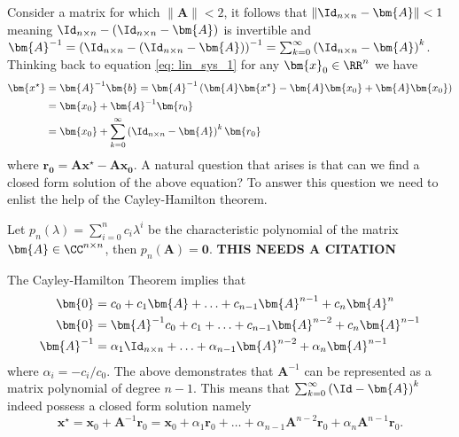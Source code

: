 Consider a matrix for which $\| \bm{A} \| < 2$, it follows that $\| \Id_{n \times n} - \bm{A} \| < 1$ meaning $\Id_{n \times n} - \left( \Id_{n \times n} - \bm{A} \right)$ is invertible and $\bm{A}^{-1} = \left( \Id_{n \times n} - \left( \Id_{n \times n} - \bm{A} \right) \right)^{-1} = \sum_{k=0}^{\infty} \left( \Id_{n \times n} - \bm{A} \right)^{k}$. Thinking back to equation \ref{eq: lin_sys_1} for any $\bm{x}_0 \in \RR^{n}$ we have
\begin{align*}
    \bm{x^{\star}} & = \bm{A}^{-1} \bm{b} = \bm{A}^{-1} \left( \bm{A} \bm{x^{\star}} - \bm{A} \bm{x_0} + \bm{A} \bm{x_0} \right) \\
                   & = \bm{x_0} + \bm{A}^{-1} \bm{r_0}                                                                           \\
                   & = \bm{x_0} + \sum_{k=0}^{\infty} \left( \Id_{n \times n} - \bm{A} \right)^k \bm{r_0}
\end{align*}
where $\bm{r_0} = \bm{A} \bm{x^{\star}} - \bm{A} \bm{x_0}$. A natural question that arises is that can we find a closed form solution of the above equation? To answer this question we need to enlist the help of the Cayley-Hamilton theorem.
\begin{thm} \label{theorem: cayley_amilton}
    Let $p_n \left( \lambda \right) = \sum_{i=0}^{n} c_i \lambda^{i}$ be the characteristic polynomial of the matrix $\bm{A} \in \CC^{n \times n}$, then $p_n \left( \bm{A} \right) = \bm{0}$. {\color{red} \textbf{THIS NEEDS A CITATION}}
\end{thm}
The Cayley-Hamilton Theorem implies that
\begin{align*}
    \bm{0}      & = c_0 + c_1 \bm{A} + \ldots + c_{n-1} \bm{A}^{n-1} + c_{n} \bm{A}^{n}                      \\
    \bm{0}      & = \bm{A}^{-1} c_0 + c_1 + \ldots + c_{n-1} \bm{A}^{n-2} + c_{n} \bm{A}^{n-1}               \\
    \bm{A}^{-1} & = \alpha_1 \Id_{n \times n} + \ldots + \alpha_{n-1} \bm{A}^{n-2} + \alpha_{n} \bm{A}^{n-1}
\end{align*}
where $\alpha_i = -c_i / c_0$. The above demonstrates that $\bm{A}^{-1}$ can be represented as a matrix polynomial of degree $n-1$. This means that $\sum_{k=0}^{\infty} \left( \Id - \bm{A} \right)^k$ indeed possess a closed form solution namely
\begin{equation} \label{eq: x_ast_via_cayley}
    \bm{x^{\star}} = \bm{x}_0 + \bm{A}^{-1} \bm{r}_0 = \bm{x}_0 + \alpha_1 \bm{r}_0 + \ldots + \alpha_{n-1} \bm{A}^{n-2} \bm{r}_0 + \alpha_{n} \bm{A}^{n-1} \bm{r}_0.
\end{equation}
